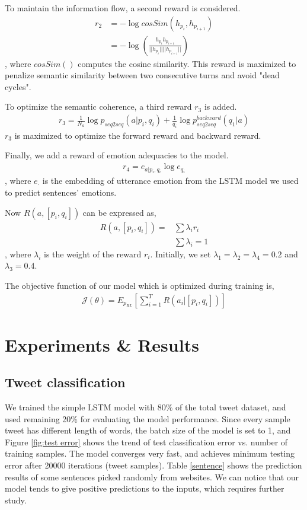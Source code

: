 \documentclass{article}
\begin{document}
To maintain the information flow, a second reward is considered.
\begin{align*}
r_2 &= - \log cosSim(h_{p_i}, h_{p_{i+1}})\\
&= - \log (\frac{h_{p_i} h_{p_{i+1}}}{||h_{p_i}|| ||h_{p_{i+1}}||})
\end{align*}
, where $cosSim()$ computes the cosine similarity. This reward is maximized to penalize semantic similarity between two consecutive turns and avoid "dead cycles".

To optimize the semantic coherence, a third reward $r_3$ is added. \begin{align*}
r_3 = \frac{1}{N_a} \log p_{seq2seq}(a|p_i, q_i) + \frac{1}{q_i} \log p^{backward}_{seq2seq}(q_1|a)
\end{align*}
$r_3$ is maximized to optimize the forward reward and backward reward. 

Finally, we add a reward of emotion adequacies to the model.
\begin{align*}
r_4 = e_{a|p_i, q_i} \log e_{q_i}
\end{align*}
, where $e_{\cdot}$ is the embedding of utterance emotion from the LSTM model we used to predict sentences' emotions.

Now $R(a, [p_i, q_i])$ can be expressed as,
\begin{align*}
R(a, [p_i, q_i]) = &\sum \lambda_i r_i\\
& \sum \lambda_i = 1
\end{align*}
, where $\lambda_i$ is the weight of the reward $r_i$. Initially, we set $\lambda_1 = \lambda_2 = \lambda_4 = 0.2$ and $\lambda_3 = 0.4$.

The objective function of our model which is optimized during training is, 
\begin{align*}
\mathcal{J}(\theta) = E_{p_{RL}}[\sum_{i=1}^{T} R(a_i|[p_i, q_i])]
\end{align*}


\section{Experiments \& Results}
\subsection{Tweet classification}

We trained the simple LSTM model with 80\% of the total tweet dataset, and used remaining 20\% for evaluating the model performance. Since every sample tweet has different length of words, the batch size of the model is set to 1, and Figure \ref{fig:test error} shows the trend of test classification error vs. number of training samples. The model converges very fast, and achieves minimum testing error after 20000 iterations (tweet samples). Table \ref{sentence} shows the prediction results of some sentences picked randomly from websites. We can notice that our model tends to give positive predictions to the inputs, which requires further study. 
\end{document}
